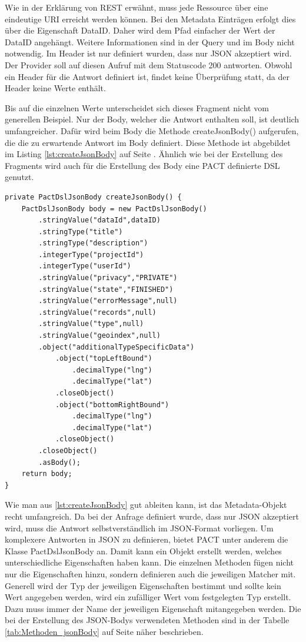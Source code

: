 \documentclass{llncs}
\begin{document}
Wie in der Erklärung von REST erwähnt, muss jede Ressource über eine eindeutige URI erreicht werden können. Bei den Metadata Einträgen erfolgt dies über die Eigenschaft DataID. Daher wird dem Pfad einfacher der Wert der DataID angehängt. Weitere Informationen sind in der Query und im Body nicht notwendig. Im Header ist nur definiert wurden, dass nur JSON akzeptiert wird.
Der Provider soll auf diesen Aufruf mit dem Statuscode 200 antworten. Obwohl ein Header für die Antwort definiert ist, findet keine Überprüfung statt, da der Header keine Werte enthält. 

Bis auf die einzelnen Werte unterscheidet sich dieses Fragment nicht vom generellen Beispiel. Nur der Body, welcher die Antwort enthalten soll, ist deutlich umfangreicher. Dafür wird beim Body die Methode createJsonBody() aufgerufen, die die zu erwartende Antwort im Body definiert. Diese Methode ist abgebildet im Listing \ref{lst:createJsonBody} auf Seite \pageref{lst:createJsonBody}. Ähnlich wie bei der Erstellung des Fragments wird auch für die Erstellung des Body eine PACT definierte DSL genutzt.

\lstset{language = Java}
\begin{lstlisting}[caption=Erstellung eines JSON-Bodys,label={lst:createJsonBody}]
private PactDslJsonBody createJsonBody() {
    PactDslJsonBody body = new PactDslJsonBody()
        .stringValue("dataId",dataID)
        .stringType("title")
        .stringType("description")
        .integerType("projectId")
        .integerType("userId")
        .stringValue("privacy","PRIVATE")
        .stringValue("state","FINISHED")
        .stringValue("errorMessage",null)
        .stringValue("records",null)
        .stringValue("type",null)
        .stringValue("geoindex",null)
        .object("additionalTypeSpecificData")
            .object("topLeftBound")
                .decimalType("lng")
                .decimalType("lat")
            .closeObject()
            .object("bottomRightBound")
                .decimalType("lng")
                .decimalType("lat")
            .closeObject()
        .closeObject()
        .asBody();
    return body;
}
\end{lstlisting}

Wie man aus \ref{lst:createJsonBody} gut ableiten kann, ist das Metadata-Objekt recht umfangreich. Da bei der Anfrage definiert wurde, dass nur JSON akzeptiert wird, muss die Antwort selbstverständlich im JSON-Format vorliegen. Um komplexere Antworten in JSON zu definieren, bietet PACT unter anderem die Klasse PactDslJsonBody an. Damit kann ein Objekt erstellt werden, welches unterschiedliche Eigenschaften haben kann. Die einzelnen Methoden fügen nicht nur die Eigenschaften hinzu, sondern definieren auch die jeweiligen Matcher mit. Generell wird der Typ der jeweiligen Eigenschaften bestimmt und sollte kein Wert angegeben werden, wird ein zufälliger Wert vom festgelegten Typ erstellt. Dazu muss immer der Name der jeweiligen Eigenschaft mitangegeben werden. Die bei der Erstellung des JSON-Bodys verwendeten Methoden sind in der Tabelle \ref{tab:Methoden_jsonBody} auf Seite \pageref{tab:Methoden_jsonBody} näher beschrieben.
\end{document}
